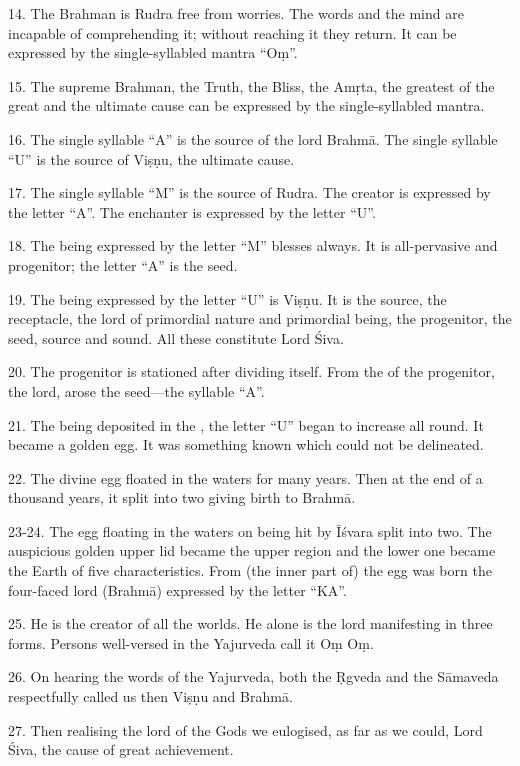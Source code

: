 14. The Brahman is Rudra free from worries. The words and the mind are incapable
of comprehending it; without reaching it they return. It can be expressed by
the single-syllabled mantra “Oṃ”.

15. The supreme Brahman, the Truth, the Bliss, the Amṛta, the greatest of
the great and the ultimate cause can be expressed by the single-syllabled mantra.

16. The single syllable “A” is the source of the lord Brahmā. The single
syllable “U” is the source of Viṣṇu, the ultimate cause.

17. The single syllable “M” is the source of Rudra. The creator is expressed by
the letter “A”. The enchanter is expressed by the letter “U”.

18. The being expressed by the letter “M” blesses always. It is all-pervasive
and progenitor; the letter “A” is the seed.

19. The being expressed by the letter “U” is Viṣṇu. It is the source,
the receptacle, the lord of primordial nature and primordial being,
the progenitor, the seed, source and sound. All these constitute Lord Śiva.

20. The progenitor is stationed after dividing itself. From the  of
the progenitor, the lord, arose the seed—the syllable “A”.

21. The  being deposited in the , the letter “U” began to
increase all round. It became a golden egg. It was something known which could
not be delineated.

22. The divine egg floated in the waters for many years. Then at the end of
a thousand years, it split into two giving birth to Brahmā.

23-24. The egg floating in the waters on being hit by Īśvara split into two.
The auspicious golden upper lid became the upper region and the lower one became
the Earth of five characteristics. From (the inner part of) the egg was born
the four-faced lord (Brahmā) expressed by the letter “KA”.

25. He is the creator of all the worlds. He alone is the lord manifesting in
three forms. Persons well-versed in the Yajurveda call it Oṃ Oṃ.

26. On hearing the words of the Yajurveda, both the Ṛgveda and the Sāmaveda
respectfully called us then Viṣṇu and Brahmā.

27. Then realising the lord of the Gods we eulogised, as far as we could, Lord
Śiva, the cause of great achievement.

